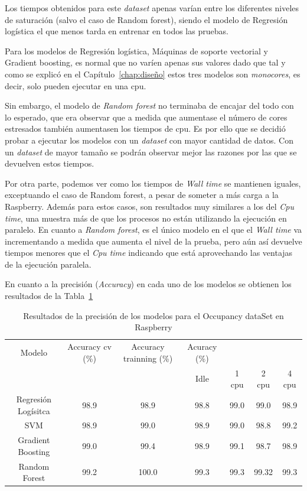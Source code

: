 \documentclass[a4paper, 12pt]{book}
\begin{document}
Los tiempos obtenidos para este \textit{dataset} apenas varían entre los diferentes niveles de saturación (salvo el caso de Random forest), siendo el modelo de Regresión logística el que menos tarda en entrenar en todos las pruebas. 

Para los modelos de Regresión logística, Máquinas de soporte vectorial y Gradient boosting, es normal que no varíen apenas sus valores dado que tal y como se explicó en el Capítulo~\ref{chap:diseño} estos tres modelos son \textit{monocores}, es decir, solo pueden ejecutar en una cpu. 

Sin embargo, el modelo de \textit{Random forest} no terminaba de encajar del todo con lo esperado, que era observar que a medida que aumentase el número de cores estresados también aumentasen los tiempos de cpu. Es por ello que se decidió probar a ejecutar los modelos con un \textit{dataset} con mayor cantidad de datos. Con un \textit{dataset} de mayor tamaño se podrán observar mejor las razones por las que se devuelven estos tiempos.

Por otra parte, podemos ver como los tiempos de \textit{Wall time} se mantienen iguales, exceptuando el caso de Random forest, a pesar de someter a más carga a la Raspberry. Además para estos casos, son resultados muy similares a los del \textit{Cpu time}, una muestra más de que los procesos no están utilizando la ejecución en paralelo. En cuanto a \textit{Random forest}, es el único modelo en el que el \textit{Wall time} va incrementando a medida que aumenta el nivel de la prueba, pero aún así devuelve tiempos menores que el \textit{Cpu time} indicando que está aprovechando las ventajas de la ejecución paralela. 

En cuanto a la precisión (\textit{Accuracy}) en cada uno de los modelos se obtienen los resultados de la Tabla~\ref{tab:acc_Occraspberry}

\begin{table}[]
\begin{adjustbox}{width=\textwidth}
\centering
    \begin{tabular}{c  c  c  c  c  c  c}
    \hline
    Modelo & Accuracy cv (\%) & Accuracy trainning (\%) & Acuracy (\%) & & & \\
    \cline{4-7}
     &   &   &  Idle & 1 cpu & 2 cpu & 4 cpu \\
     \hline
     Regresión Logísitca & 98.9 & 98.9 & 98.8 & 99.0 & 99.0 & 98.9\\
     SVM & 98.9 & 99.0 & 98.9 & 99.0 & 98.8 & 99.2\\
     Gradient Boosting & 99.0 & 99.4 & 98.9 & 99.1 & 98.7 & 98.9\\
     Random Forest & 99.2 & 100.0 & 99.3 & 99.3 & 99.32 & 99.3\\
    \hline
    \end{tabular}
\end{adjustbox}
\caption{Resultados de la precisión de los modelos para el Occupancy dataSet en Raspberry}
\label{tab:acc_Occraspberry}
\end{table}
\end{document}
